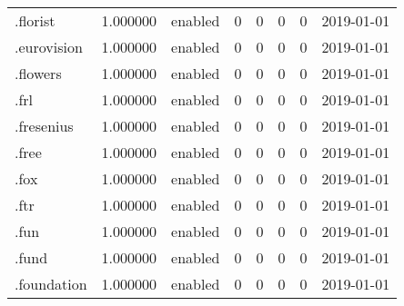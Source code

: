 \begin{tabular}{lrlrrrrl}
.florist                  &          1.000000 &         enabled &                           0 &                           0 &                           0 &                   0 &           2019-01-01 \\
.eurovision               &          1.000000 &         enabled &                           0 &                           0 &                           0 &                   0 &           2019-01-01 \\
.flowers                  &          1.000000 &         enabled &                           0 &                           0 &                           0 &                   0 &           2019-01-01 \\
.frl                      &          1.000000 &         enabled &                           0 &                           0 &                           0 &                   0 &           2019-01-01 \\
.fresenius                &          1.000000 &         enabled &                           0 &                           0 &                           0 &                   0 &           2019-01-01 \\
.free                     &          1.000000 &         enabled &                           0 &                           0 &                           0 &                   0 &           2019-01-01 \\
.fox                      &          1.000000 &         enabled &                           0 &                           0 &                           0 &                   0 &           2019-01-01 \\
.ftr                      &          1.000000 &         enabled &                           0 &                           0 &                           0 &                   0 &           2019-01-01 \\
.fun                      &          1.000000 &         enabled &                           0 &                           0 &                           0 &                   0 &           2019-01-01 \\
.fund                     &          1.000000 &         enabled &                           0 &                           0 &                           0 &                   0 &           2019-01-01 \\
.foundation               &          1.000000 &         enabled &                           0 &                           0 &                           0 &                   0 &           2019-01-01 \\

\end{tabular}
